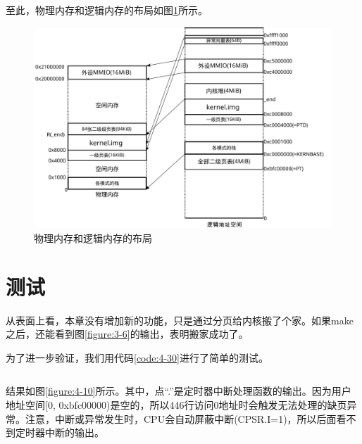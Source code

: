 \documentclass[main.tex]{subfiles}
\begin{document}
\begin{CJK*}{UTF8}{song}
\begin{code}
\label{code:4-29}
\inputminted[firstline=398,lastline=410,linenos,numbersep=5pt,frame=lines,framesep=2mm]{c}{src/chapter04/kernel/machdep.c}
\end{code}

至此，物理内存和逻辑内存的布局如图\ref{figure:4-9}所示。

\begin{figure}[htp]
\centering
\includegraphics[scale=0.3]{figures/4-9}
\caption{物理内存和逻辑内存的布局}
\label{figure:4-9}
\end{figure}

\section{测试}
从表面上看，本章没有增加新的功能，只是通过分页给内核搬了个家。如果make之后，还能看到图\ref{figure:3-6}的输出，表明搬家成功了。

\par
为了进一步验证，我们用代码\ref{code:4-30}进行了简单的测试。

\begin{code}
\label{code:4-30}
\inputminted[firstline=438,lastline=447,linenos,numbersep=5pt,frame=lines,framesep=2mm]{c}{src/chapter04/kernel/machdep.c}
\end{code}

结果如图\ref{figure:4-10}所示。其中，点“.”是定时器中断处理函数的输出。因为用户地址空间[0, 0xbfc00000)是空的，所以446行访问0地址时会触发无法处理的缺页异常。注意，中断或异常发生时，CPU会自动屏蔽中断(CPSR.I=1)，所以后面看不到定时器中断的输出。


\end{CJK*}
\end{document}
